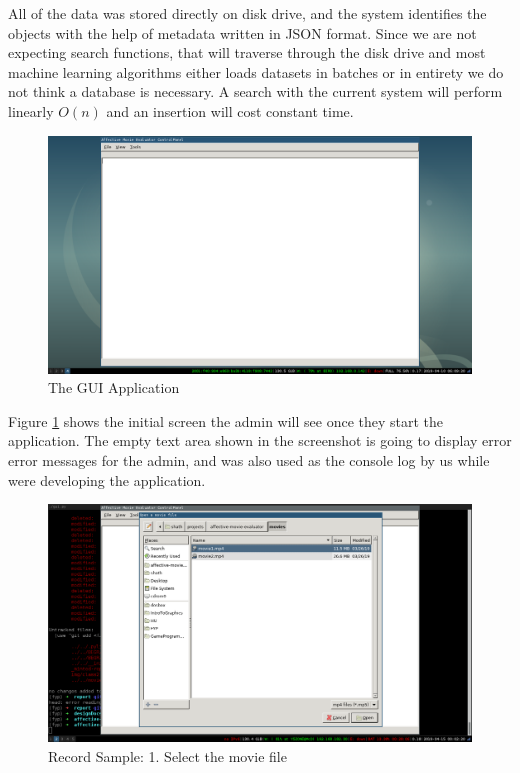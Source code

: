 \documentclass[12pt,a4paper,man]{report}
\begin{document}
All of the data was stored directly on disk drive, and the system identifies the objects with the help of metadata written in JSON format. Since we are not expecting search functions, that will traverse through the disk drive and most machine learning algorithms either loads datasets in batches or in entirety we do not think a database is necessary. A search with the current system will perform linearly \(O(n)\) and an insertion will cost constant time.

\begin{figure}[htbp]
\centering
\includegraphics[width=5in]{./ext_img/sc1.png}
\caption{\label{fig:sc1}
The GUI Application}
\end{figure}

Figure \ref{fig:sc1} shows the initial screen the admin will see once they start the application. The empty text area shown in the screenshot is going to display error error messages for the admin, and was also used as the console log by us while were developing the application.

\begin{figure}[htbp]
\centering
\includegraphics[width=5in]{./ext_img/sc1.1.png}
\caption{\label{fig:sc12}
Record Sample: 1. Select the movie file}
\end{figure}
\end{document}
